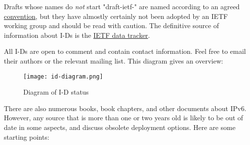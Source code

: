 \documentclass[
]{article}
\begin{document}
Drafts whose names do \emph{not} start "draft-ietf-" are named according
to an agreed
\href{https://authors.ietf.org/naming-your-internet-draft}{convention},
but they have almostly certainly not been adopted by an IETF working
group and should be read with caution. The definitive source of
information about I-Ds is the \href{https://datatracker.ietf.org/}{IETF
data tracker}.

All I-Ds are open to comment and contain contact information. Feel free
to email their authors or the relevant mailing list. This diagram gives
an overview:

\begin{figure}
\centering
\texttt{[image: id-diagram.png]}
\caption{Diagram of I-D status}
\end{figure}

There are also numerous books, book chapters, and other documents about
IPv6. However, any source that is more than one or two years old is
likely to be out of date in some aspects, and discuss obsolete
deployment options. Here are some starting points:
\end{document}
